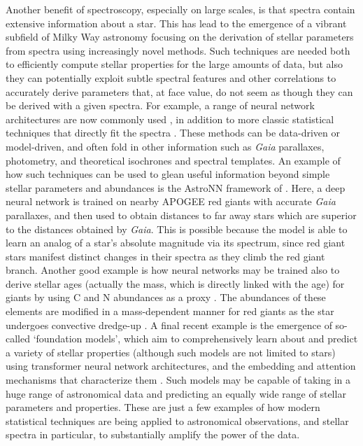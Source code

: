 Another benefit of spectroscopy, especially on large scales, is that spectra contain extensive information about a star. This has lead to the emergence of a vibrant subfield of Milky Way astronomy focusing on the derivation of stellar parameters from spectra using increasingly novel methods. Such techniques are needed both to efficiently compute stellar properties for the large amounts of data, but also they can potentially exploit subtle spectral features and other correlations to accurately derive parameters that, at face value, do not seem as though they can be derived with a given spectra. For example, a range of neural network architectures are now commonly used \parencite[e.g.][]{leung19a,leung19b,ting19}, in addition to more classic statistical techniques that directly fit the spectra \parencite[e.g.][]{ness15,queiroz18,cargile20}. These methods can be data-driven or model-driven, and often fold in other information such as \textit{Gaia} parallaxes, photometry, and theoretical isochrones and spectral templates. An example of how such techniques can be used to glean useful information beyond simple stellar parameters and abundances is the AstroNN framework of \textcite{leung19b}. Here, a deep neural network is trained on nearby APOGEE red giants with accurate \textit{Gaia} parallaxes, and then used to obtain distances to far away stars which are superior to the distances obtained by \textit{Gaia}. This is possible because the model is able to learn an analog of a star's absolute magnitude via its spectrum, since red giant stars manifest distinct changes in their spectra as they climb the red giant branch. Another good example is how neural networks may be trained also to derive stellar ages (actually the mass, which is directly linked with the age) for giants by using C and N abundances as a proxy \parencite{leung23}. The abundances of these elements are modified in a mass-dependent manner for red giants as the star undergoes convective dredge-up \parencite{martig16}. A final recent example is the emergence of so-called `foundation models', which aim to comprehensively learn about and predict a variety of stellar properties (although such models are not limited to stars) using transformer neural network architectures, and the embedding and attention mechanisms that characterize them \parencite[e.g.][]{leung24}. Such models may be capable of taking in a huge range of astronomical data and predicting an equally wide range of stellar parameters and properties. These are just a few examples of how modern statistical techniques are being applied to astronomical observations, and stellar spectra in particular, to substantially amplify the power of the data.

